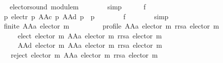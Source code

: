 \begin{isabellebody}
\ \ \ \ \ \ \isamarkupfalse%
\ elector{\isacharunderscore}{\kern0pt}sound\ module{\isacharunderscore}{\kern0pt}m\isanewline
\ \ \ \ \ \ \isamarkupfalse%
\ simp\isanewline
\ \ \ \ \isamarkupfalse%
\ f{}{\isacharcolon}{\kern0pt}\isanewline
\ \ \ \ \ \ {\isachardoublequoteopen}{\isasymforall}p{\isachardot}{\kern0pt}\ {\isacharparenleft}{\kern0pt}elect{\isacharunderscore}{\kern0pt}r\ p{\isacharcomma}{\kern0pt}\ AAc\ p{\isacharcomma}{\kern0pt}\ AAd\ p{\isacharparenright}{\kern0pt}\ {\isacharequal}{\kern0pt}\ p{\isachardoublequoteclose}\isanewline
\ \ \ \ \ \ \isamarkupfalse%
\ f{}\isanewline
\ \ \ \ \ \ \isamarkupfalse%
\ simp\isanewline
\ \ \ \ \isamarkupfalse%
\isanewline
\ \ \ \ \ \ {\isachardoublequoteopen}finite\ {\isacharparenleft}{\kern0pt}AAa\ {\isacharparenleft}{\kern0pt}elector\ m{\isacharparenright}{\kern0pt}{\isacharparenright}{\kern0pt}\ {\isasymand}\isanewline
\ \ \ \ \ \ \ \ profile\ {\isacharparenleft}{\kern0pt}AAa\ {\isacharparenleft}{\kern0pt}elector\ m{\isacharparenright}{\kern0pt}{\isacharparenright}{\kern0pt}\ {\isacharparenleft}{\kern0pt}rrsa\ {\isacharparenleft}{\kern0pt}elector\ m{\isacharparenright}{\kern0pt}{\isacharparenright}{\kern0pt}\ {\isasymand}\isanewline
\ \ \ \ \ \ \ \ {\isacharbraceleft}{\kern0pt}{\isacharbraceright}{\kern0pt}\ {\isacharequal}{\kern0pt}\ elect\ {\isacharparenleft}{\kern0pt}elector\ m{\isacharparenright}{\kern0pt}\ {\isacharparenleft}{\kern0pt}AAa\ {\isacharparenleft}{\kern0pt}elector\ m{\isacharparenright}{\kern0pt}{\isacharparenright}{\kern0pt}\ {\isacharparenleft}{\kern0pt}rrsa\ {\isacharparenleft}{\kern0pt}elector\ m{\isacharparenright}{\kern0pt}{\isacharparenright}{\kern0pt}\ {\isasymand}\isanewline
\ \ \ \ \ \ \ \ {\isacharbraceleft}{\kern0pt}{\isacharbraceright}{\kern0pt}\ {\isacharequal}{\kern0pt}\ AAd\ {\isacharparenleft}{\kern0pt}elector\ m\ {\isacharparenleft}{\kern0pt}AAa\ {\isacharparenleft}{\kern0pt}elector\ m{\isacharparenright}{\kern0pt}{\isacharparenright}{\kern0pt}\ {\isacharparenleft}{\kern0pt}rrsa\ {\isacharparenleft}{\kern0pt}elector\ m{\isacharparenright}{\kern0pt}{\isacharparenright}{\kern0pt}{\isacharparenright}{\kern0pt}\ {\isasymand}\isanewline
\ \ \ \ \ \ \ \ reject\ {\isacharparenleft}{\kern0pt}elector\ m{\isacharparenright}{\kern0pt}\ {\isacharparenleft}{\kern0pt}AAa\ {\isacharparenleft}{\kern0pt}elector\ m{\isacharparenright}{\kern0pt}{\isacharparenright}{\kern0pt}\ {\isacharparenleft}{\kern0pt}rrsa\ {\isacharparenleft}{\kern0pt}elector\ m{\isacharparenright}{\kern0pt}{\isacharparenright}{\kern0pt}\ {\isacharequal}{\kern0pt}\isanewline

\end{isabellebody}

